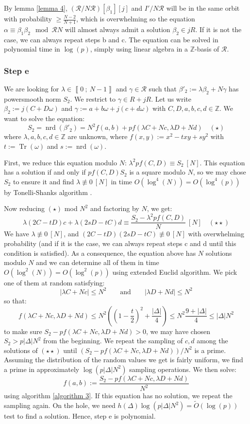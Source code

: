 \documentclass[a4paper,10pt]{report}
\theoremstyle{definition}
\theoremstyle{plain}
\theoremstyle{definition}
\newcommand{\Z}{\mathbb{Z}}
\newcommand{\m}[1]{\mathcal{#1}}
\renewcommand{\i}[2]{\left\llbracket #1~;~#2\right\rrbracket}
\renewcommand{\(}{\left(}
\renewcommand{\)}{\right)}
\DeclareMathOperator{\Tr}{Tr}
\DeclareMathOperator{\nrd}{nrd}
\begin{document}
By lemma \ref{lemma 4}, $(\m{R}/N\m{R})[\beta_1][j]$ and $I'/N\m{R}$ will be in the same orbit with probability $\geq \frac{N-2}{N+1}$, which is overwhelming so the equation $\alpha\equiv\beta_1\beta_2 \mod \m{R}N$ will almost always admit a solution $\beta_2\in jR$. If it is not the case, we can always repeat steps b and c. The equation can be solved in polynomial time in $\log(p)$, simply using linear algebra in a $\Z$-basis of $\m{R}$.

\subsubsection{Step e}

We are looking for $\lambda\in\i{0}{N-1}$ and $\gamma\in\m{R}$ such that $\beta'_2:=\lambda\beta_2+N\gamma$ has powersmooth norm $S_2$.  We restrict to $\gamma\in R+jR$. Let us write $\beta_2:=j(C+D\omega)$ and $\gamma:=a+b\omega+j(c+d\omega)$ with $C, D, a,b,c,d\in\Z$. We want to solve the equation:
\[S_2=\nrd(\beta'_2)=N^2f(a,b)+pf(\lambda C+Nc,\lambda D+Nd)\quad (\star)\]
where $\lambda,a,b,c,d\in\Z$ are unknown, where $f(x,y):=x^2-txy+sy^2$ with $t:=\Tr(\omega)$ and $s:=\nrd(\omega)$. 

First, we reduce this equation modulo $N$: $\lambda^2 p f(C,D)\equiv S_2 \ [N]$. This equation has a solution if and only if $p f(C,D) S_2$ is a square modulo $N$, so we may chose $S_2$ to ensure it and find $\lambda\not\equiv 0 \ [N]$ in time $O(\log^4(N))=O(\log^4(p))$ by Tonelli-Shanks algorithm \cite[algorithm 1.5.1]{Cohen1}.  

Now reducing $(\star)$ mod $N^2$ and factoring by $N$, we get:
\[\lambda(2C-tD)c+\lambda(2sD-tC)d\equiv \frac{S_2-\lambda^2 p f(C,D)}{N} \ [N]\quad (\star\star)\]
We have $\lambda\not\equiv 0 \ [N]$, and $(2C-tD)(2sD-tC)\not\equiv 0 \ [N]$ with overwhelming probability (and if it is the case, we can always repeat steps c and d until this condition is satisfied). As a consequence, the equation above has $N$ solutions modulo $N$ and we can determine all of them in time $O(\log^2(N))=O(\log^2(p))$ using extended Euclid algorithm.  We pick one of them at random satisfying:
\[|\lambda C+Nc|\leq N^2 \qquad \mbox{and} \qquad |\lambda D+Nd|\leq N^2\]
so that:
\[f(\lambda C+Nc,\lambda D+Nd)\leq N^2\(\(1-\frac{t}{2}\)^2+\frac{|\Delta|}{4}\)\leq N^2\frac{9+|\Delta|}{4}\leq |\Delta|N^2\]
to make sure $S_2-pf(\lambda C+Nc,\lambda D+Nd)>0$, we may have chosen $S_2>p|\Delta|N^2$ from the beginning. We repeat the sampling of $c,d$ among the solutions of $(\star\star)$ until $(S_2-pf(\lambda C+Nc,\lambda D+Nd))/N^2$ is a prime. Assuming the distribution of the random values we get is fairly uniform, we find a prime in approximately $\log(p|\Delta|N^2)$ sampling operations. We then solve:
\[f(a,b):=\frac{S_2-pf(\lambda C+Nc,\lambda D+Nd)}{N^2}\]
using algorithm \ref{algorithm 3}. If this equation has no solution, we repeat the sampling again. On the hole, we need $h(\Delta)\log(p|\Delta|N^2)=\tilde{O}(\log(p))$ test to find a solution. Hence, step e is polynomial.
\end{document}
